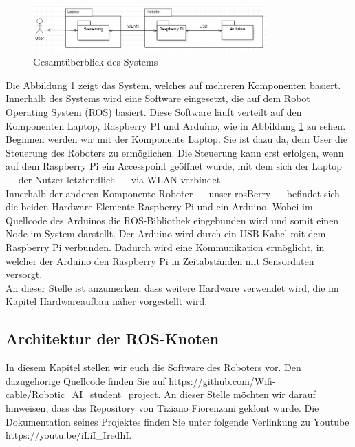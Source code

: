 \documentclass[conference]{IEEEtran}
\begin{document}
\begin{figure}[!ht]
	\centering
	\includegraphics[width=9cm]{img/Gesamtsystem.PNG}
	\caption{Gesamtüberblick des Systems}
	\label{Gesamtzusammenhang}
\end{figure}
Die Abbildung \ref{Gesamtzusammenhang} zeigt das System, welches auf mehreren Komponenten basiert.
Innerhalb des Systems wird eine Software eingesetzt, die auf dem Robot Operating System (ROS) basiert.
Diese Software läuft verteilt auf den Komponenten Laptop, Raspberry PI und Arduino, wie in Abbildung \ref{Gesamtzusammenhang} zu sehen.
\\
Beginnen werden wir mit der Komponente Laptop.
Sie ist dazu da, dem User die Steuerung des Roboters zu ermöglichen.
Die Steuerung kann erst erfolgen, wenn auf dem Raspberry Pi ein Accesspoint geöffnet wurde, mit dem sich der Laptop — der Nutzer letztendlich — via WLAN verbindet.
\\
Innerhalb der anderen Komponente Roboter — unser rosBerry — befindet sich die beiden Hardware-Elemente Raspberry Pi und ein Arduino. Wobei im Quellcode des Arduinos die ROS-Bibliothek eingebunden wird und somit einen Node im System darstellt.
Der Arduino wird durch ein USB Kabel mit dem Raspberry Pi verbunden.
Dadurch wird eine Kommunikation ermöglicht, in welcher der Arduino den Raspberry Pi in Zeitabständen mit Sensordaten versorgt.
\\
An dieser Stelle ist anzumerken, dass weitere Hardware verwendet wird, die im Kapitel Hardwareaufbau näher vorgestellt wird.

\subsection{Architektur der ROS-Knoten}\label{sec:Architektur}

In diesem Kapitel stellen wir euch die Software des Roboters vor.
Den dazugehörige Quellcode finden Sie auf https://github.com/Wifi-cable/Robotic\_AI\_student\_project.
An dieser Stelle möchten wir darauf hinweisen, dass das Repository von Tiziano Fiorenzani geklont wurde.
Die Dokumentation seines Projektes finden Sie unter folgende Verlinkung zu Youtube https://youtu.be/iLiI\_IredhI.
\end{document}
